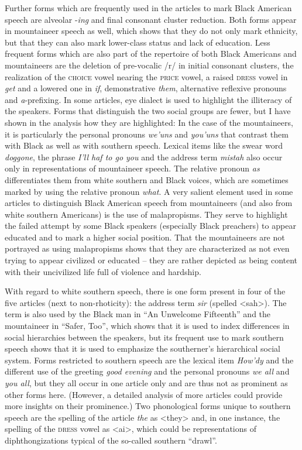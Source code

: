 Further forms which are frequently used in the articles to mark Black American speech are alveolar -\emph{ing} and final consonant cluster reduction. Both forms appear in mountaineer speech as well, which shows that they do not only mark ethnicity, but that they can also mark lower-class status and lack of education. Less frequent forms which are also part of the repertoire of both Black Americans and mountaineers are the deletion of pre-vocalic /r/ in initial consonant clusters, the realization of the \textsc{choice} vowel nearing the \textsc{price} vowel, a raised \textsc{dress} vowel in \emph{get} and a lowered one in \emph{if}, demonstrative \emph{them}, alternative reflexive pronouns and \emph{a}{}-prefixing. In some articles, eye dialect is used to highlight the illiteracy of the speakers. Forms that distinguish the two social groups are fewer, but I have shown in the analysis how they are highlighted: In the case of the mountaineers, it is particularly the personal pronouns \emph{we’uns} and \emph{you’uns} that contrast them with Black as well as with southern speech. Lexical items like the swear word \emph{doggone}, the phrase \emph{I’ll haf to go you} and the address term \emph{mistah} also occur only in representations of mountaineer speech. The relative pronoun \emph{as} differentiates them from white southern and Black voices, which are sometimes marked by using the relative pronoun \emph{what}. A very salient element used in some articles to distinguish Black American speech from mountaineers (and also from white southern Americans) is the use of malapropisms. They serve to highlight the failed attempt by some Black speakers (especially Black preachers) to appear educated and to mark a higher social position. That the mountaineers are not portrayed as using malapropisms shows that they are characterized as not even trying to appear civilized or educated – they are rather depicted as being content with their uncivilized life full of violence and hardship.

With regard to white southern speech, there is one form present in four of the five articles (next to non-rhoticity): the address term \emph{sir} (spelled <sah>). The term is also used by the Black man in “An Unwelcome Fifteenth” and the mountaineer in “Safer, Too”, which shows that it is used to index differences in social hierarchies between the speakers, but its frequent use to mark southern speech shows that it is used to emphasize the southerner’s hierarchical social system. Forms restricted to southern speech are the lexical item \emph{How’dy} and the different use of the greeting \emph{good evening} and the personal pronouns \emph{we all} and \emph{you all}, but they all occur in one article only and are thus not as prominent as other forms here. (However, a detailed analysis of more articles could provide more insights on their prominence.) Two phonological forms unique to southern speech are the spelling of the article \emph{the} as <they> and, in one instance, the spelling of the \textsc{dress} vowel as <ai>, which could be representations of diphthongizations typical of the so-called southern “drawl”.

